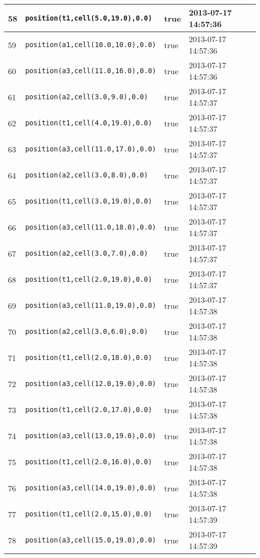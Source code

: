 \documentclass[11pt]{article}\usepackage[utf8]{inputenc}\usepackage{geometry}
\begin{document}
\begin{table}[ht]
\begin{tabular}{l l l l}
58&\texttt{position(t1,cell(5.0,19.0),0.0)}&true&2013-07-17 14:57:36\\ [1ex] \hline
59&\texttt{position(a1,cell(10.0,10.0),0.0)}&true&2013-07-17 14:57:36\\ [1ex] \hline
60&\texttt{position(a3,cell(11.0,16.0),0.0)}&true&2013-07-17 14:57:36\\ [1ex] \hline
61&\texttt{position(a2,cell(3.0,9.0),0.0)}&true&2013-07-17 14:57:37\\ [1ex] \hline
62&\texttt{position(t1,cell(4.0,19.0),0.0)}&true&2013-07-17 14:57:37\\ [1ex] \hline
63&\texttt{position(a3,cell(11.0,17.0),0.0)}&true&2013-07-17 14:57:37\\ [1ex] \hline
64&\texttt{position(a2,cell(3.0,8.0),0.0)}&true&2013-07-17 14:57:37\\ [1ex] \hline
65&\texttt{position(t1,cell(3.0,19.0),0.0)}&true&2013-07-17 14:57:37\\ [1ex] \hline
66&\texttt{position(a3,cell(11.0,18.0),0.0)}&true&2013-07-17 14:57:37\\ [1ex] \hline
67&\texttt{position(a2,cell(3.0,7.0),0.0)}&true&2013-07-17 14:57:37\\ [1ex] \hline
68&\texttt{position(t1,cell(2.0,19.0),0.0)}&true&2013-07-17 14:57:37\\ [1ex] \hline
69&\texttt{position(a3,cell(11.0,19.0),0.0)}&true&2013-07-17 14:57:38\\ [1ex] \hline
70&\texttt{position(a2,cell(3.0,6.0),0.0)}&true&2013-07-17 14:57:38\\ [1ex] \hline
71&\texttt{position(t1,cell(2.0,18.0),0.0)}&true&2013-07-17 14:57:38\\ [1ex] \hline
72&\texttt{position(a3,cell(12.0,19.0),0.0)}&true&2013-07-17 14:57:38\\ [1ex] \hline
73&\texttt{position(t1,cell(2.0,17.0),0.0)}&true&2013-07-17 14:57:38\\ [1ex] \hline
74&\texttt{position(a3,cell(13.0,19.0),0.0)}&true&2013-07-17 14:57:38\\ [1ex] \hline
75&\texttt{position(t1,cell(2.0,16.0),0.0)}&true&2013-07-17 14:57:38\\ [1ex] \hline
76&\texttt{position(a3,cell(14.0,19.0),0.0)}&true&2013-07-17 14:57:38\\ [1ex] \hline
77&\texttt{position(t1,cell(2.0,15.0),0.0)}&true&2013-07-17 14:57:39\\ [1ex] \hline
78&\texttt{position(a3,cell(15.0,19.0),0.0)}&true&2013-07-17 14:57:39\\ [1ex] \hline

\end{tabular}
\end{table}
\end{document}
